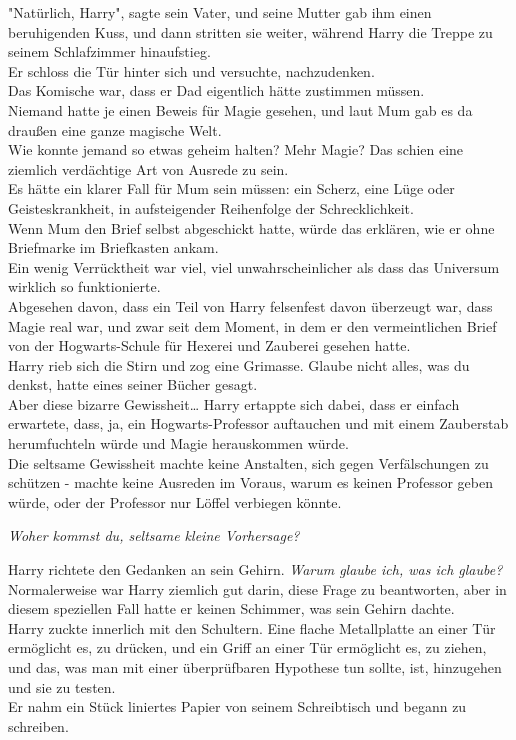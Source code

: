 {"Natürlich, Harry", sagte sein Vater, und seine Mutter gab ihm einen beruhigenden Kuss, und dann stritten sie weiter, während Harry die Treppe zu seinem Schlafzimmer hinaufstieg.\\ Er schloss die Tür hinter sich und versuchte, nachzudenken.\\ Das Komische war, dass er Dad eigentlich hätte zustimmen müssen.\\ Niemand hatte je einen Beweis für Magie gesehen, und laut Mum gab es da draußen eine ganze magische Welt.\\ Wie konnte jemand so etwas geheim halten? Mehr Magie? Das schien eine ziemlich verdächtige Art von Ausrede zu sein.\\ Es hätte ein klarer Fall für Mum sein müssen: ein Scherz, eine Lüge oder Geisteskrankheit, in aufsteigender Reihenfolge der Schrecklichkeit.\\ Wenn Mum den Brief selbst abgeschickt hatte, würde das erklären, wie er ohne Briefmarke im Briefkasten ankam.\\ Ein wenig Verrücktheit war viel, viel unwahrscheinlicher als dass das Universum wirklich so funktionierte.\\ Abgesehen davon, dass ein Teil von Harry felsenfest davon überzeugt war, dass Magie real war, und zwar seit dem Moment, in dem er den vermeintlichen Brief von der Hogwarts-Schule für Hexerei und Zauberei gesehen hatte.\\ Harry rieb sich die Stirn und zog eine Grimasse. Glaube nicht alles, was du denkst, hatte eines seiner Bücher gesagt.\\ Aber diese bizarre Gewissheit… Harry ertappte sich dabei, dass er einfach erwartete, dass, ja, ein Hogwarts-Professor auftauchen und mit einem Zauberstab herumfuchteln würde und Magie herauskommen würde.\\ Die seltsame Gewissheit machte keine Anstalten, sich gegen Verfälschungen zu schützen - machte keine Ausreden im Voraus, warum es keinen Professor geben würde, oder der Professor nur Löffel verbiegen könnte.

\emph{Woher kommst du, seltsame kleine Vorhersage?}

Harry richtete den Gedanken an sein Gehirn. \emph{Warum glaube ich, was ich glaube?} Normalerweise war Harry ziemlich gut darin, diese Frage zu beantworten, aber in diesem speziellen Fall hatte er keinen Schimmer, was sein Gehirn dachte.\\ Harry zuckte innerlich mit den Schultern. Eine flache Metallplatte an einer Tür ermöglicht es, zu drücken, und ein Griff an einer Tür ermöglicht es, zu ziehen, und das, was man mit einer überprüfbaren Hypothese tun sollte, ist, hinzugehen und sie zu testen.\\ Er nahm ein Stück liniertes Papier von seinem Schreibtisch und begann zu schreiben.

}
